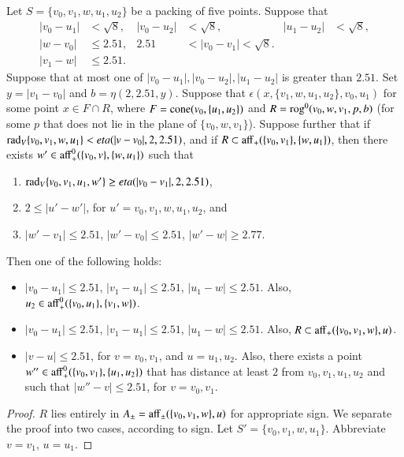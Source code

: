 \begin{tarskidata}
\begin{tarski}
\begin{lemma}
 Let $S=\{v_0,v_1,w,u_1,u_2\}$ be a packing of five points.
Suppose that 
   $$
   \begin{array}{rlrlrll}
   |v_0-u_1|&<\sqrt8,& |v_0-u_2|&<\sqrt8,& |u_1-u_2|&<\sqrt8,\\
   |w-v_0|&\le 2.51, &2.51&<|v_0-v_1|<\sqrt8.\\
   |v_1-w|&\le 2.51.
   \end{array}
   $$
Suppose that at most one of $|v_0-u_1|,|v_0-u_2|,|u_1-u_2|$ is
greater than $2.51$.
%
Set $y=|v_1-v_0|$ and $b=\eta(2,2.51,y)$.
Suppose that $\epsilon(x,\{v_1,w,u_1,u_2\},v_0,u_1)$ for some point
$x\in F\cap R$, where $F={\operatorname{cone}}(v_0,\{u_1,u_2\})$ and
$R={\operatorname{rog}}^0(v_0,w,v_1,p,b)$ (for some $p$ that
does not lie in the plane of $\{v_0,w,v_1\}$).
Suppose further 
that if $\operatorname{rad}_V\{v_0,v_1,w,u_1\} < eta(|v-v_0|,2,2.51)$, 
and if $R\subset {\operatorname{aff}}_+(\{v_0,v_1\},\{w,u_1\})$,
then there exists
$w'\in{\operatorname{aff}}_+^0(\{v_0,v\},\{w,u_1\})$ such that 
  \begin{enumerate}
  \item $\operatorname{rad}_V\{v_0,v_1,u_1,w'\} \ge eta(|v_0-v_1|,2,2.51)$, 
  \item $2\le |u'-w'|$, for $u'=v_0,v_1,w,u_1,u_2$, and
  \item $|w'-v_1|\le 2.51$, $|w'-v_0|\le 2.51$, $|w'-w|\ge 2.77$.
  \end{enumerate}
Then one of the following holds:
  \begin{itemize}
  \item $|v_0-u_1|\le 2.51$, $|v_1-u_1|\le 2.51$, $|u_1-w|\le 2.51$.
   Also, $u_2\in {\operatorname{aff}}_+^0(\{v_0,u_1\},\{v_1,w\})$.
  \item $|v_0-u_1|\le 2.51$, $|v_1-u_1|\le 2.51$, $|u_1-w|\le 2.51$.
  Also, $R\subset {\operatorname{aff}}_+(\{v_0,v_1,w\},u)$.
  \item $|v-u|\le 2.51$, for $v=v_0,v_1$, and $u=u_1,u_2$.  Also,
   there exists a point $w''\in{\operatorname{aff}}_+^0(\{v_0,v_1\},\{u_1,u_2\})$ 
   that has distance at least $2$ from
   $v_0,v_1,u_1,u_2$ and such that
   $|w''-v|\le 2.51$, for $v=v_0,v_1$.
  \end{itemize}
\end{lemma}

\begin{proof} $R$ lies entirely in
$A_\pm={\operatorname{aff}}_\pm(\{v_0,v_1,w\},u)$ for appropriate sign.
We separate the proof into two cases, according to sign.
Let $S'=\{v_0,v_1,w,u_1\}$.  Abbreviate $v=v_1$, $u=u_1$.


\end{proof}
\end{tarski}
\end{tarskidata}
